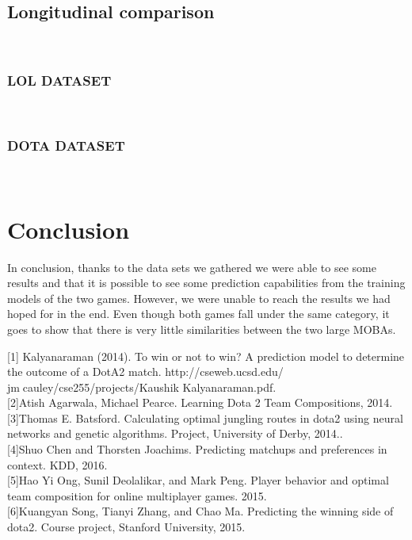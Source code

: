 \documentclass[a4paper,fleqn]{cas-sc}
\begin{document}
\subsection{ Longitudinal comparison}
\\
\subsubsection{LOL DATASET}
\\
\subsubsection{DOTA DATASET}

\\

\section{Conclusion}
In conclusion, thanks to the data sets we gathered we were able to see some results and that it is possible to see some prediction capabilities from the training models of the two games. However, we were unable to reach the results we had hoped for in the end. Even though both games fall under the same category, it goes to show that there is very little similarities between the two large MOBAs.

\par
\printcredits

% 






\bio{}
[1] Kalyanaraman (2014). To win or not to win? A prediction model to determine the outcome of a DotA2 match. http://cseweb.ucsd.edu/ jmcauley/cse255/projects/Kaushik Kalyanaraman.pdf.\\
\bio{}
[2]Atish Agarwala, Michael Pearce. Learning Dota 2 Team Compositions, 2014.\\
\bio{}
[3]Thomas E. Batsford. Calculating optimal jungling routes in dota2 using neural networks and genetic algorithms. Project, University of Derby, 2014..\\
\bio{}
[4]Shuo Chen and Thorsten Joachims. Predicting matchups and preferences in context. KDD, 2016.\\
\bio{}
[5]Hao Yi Ong, Sunil Deolalikar, and Mark Peng. Player behavior and optimal team composition for online multiplayer games. 2015.\\
\bio{}
[6]Kuangyan Song, Tianyi Zhang, and Chao Ma. Predicting the winning side of dota2. Course project, Stanford University, 2015.\\

\endbio
\end{document}
